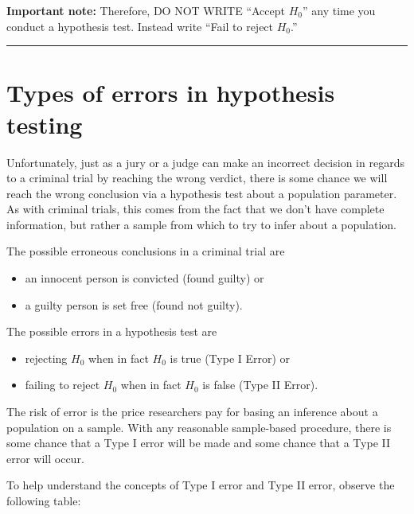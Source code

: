\documentclass[12pt,]{krantz}
\providecommand{\tightlist}{%
  \setlength{\itemsep}{0pt}\setlength{\parskip}{0pt}}
\theoremstyle{definition}
\theoremstyle{definition}
\theoremstyle{definition}
\theoremstyle{remark}
\begin{document}
\textbf{Important note:} Therefore, DO NOT WRITE ``Accept \(H_0\)'' any
time you conduct a hypothesis test. Instead write ``Fail to reject
\(H_0\).''

\begin{center}\rule{0.5\linewidth}{\linethickness}\end{center}

\section{Types of errors in hypothesis
testing}\label{types-of-errors-in-hypothesis-testing}

Unfortunately, just as a jury or a judge can make an incorrect decision
in regards to a criminal trial by reaching the wrong verdict, there is
some chance we will reach the wrong conclusion via a hypothesis test
about a population parameter. As with criminal trials, this comes from
the fact that we don't have complete information, but rather a sample
from which to try to infer about a population.

The possible erroneous conclusions in a criminal trial are

\begin{itemize}
\tightlist
\item
  an innocent person is convicted (found guilty) or
\item
  a guilty person is set free (found not guilty).
\end{itemize}

The possible errors in a hypothesis test are

\begin{itemize}
\tightlist
\item
  rejecting \(H_0\) when in fact \(H_0\) is true (Type I Error) or
\item
  failing to reject \(H_0\) when in fact \(H_0\) is false (Type II
  Error).
\end{itemize}

The risk of error is the price researchers pay for basing an inference
about a population on a sample. With any reasonable sample-based
procedure, there is some chance that a Type I error will be made and
some chance that a Type II error will occur.

To help understand the concepts of Type I error and Type II error,
observe the following table:
\end{document}
